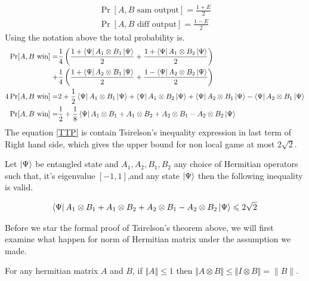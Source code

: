 \begin{align*}
\Pr[A,B \text{ sam output}]=\frac{1+E}{2}\\
\Pr[A,B \text{ diff output}]=\frac{1-E}{2}
\end{align*}
Using the notation above the total probability is.
\begin{align}\label{TTP}
\Pr[A,B \text{ win}]=&\frac{1}{4}\left(\frac{1+\bra{\Psi}A_1\otimes B_1\ket{\Psi}}{2}
+\frac{1+\bra{\Psi}A_1\otimes B_2\ket{\Psi}}{2}\right)\nonumber\\
+&\frac{1}{4}\left(\frac{1+\bra{\Psi}A_2\otimes B_1\ket{\Psi}}{2}+\frac{1-\bra{\Psi}A_2\otimes B_2\ket{\Psi}}{2}\right)\nonumber\\
4 \Pr[A,B \text{ win}]=& 2+\frac{1}{2}\bra{\Psi}A_1\otimes B_1\ket{\Psi}
+\bra{\Psi}A_1\otimes B_2\ket{\Psi}+\bra{\Psi}A_2\otimes B_1\ket{\Psi}-\bra{\Psi}A_2\otimes B_1\ket{\Psi}\nonumber\\
\Pr[A,B \text{ win}]=&\frac{1}{2}+\frac{1}{8}\bra{\Psi}A_1\otimes B_1+ A_1\otimes B_2+A_2\otimes B_1 -A_2\otimes B_2\ket{\Psi}
\end{align}
The  equation \ref{TTP} is contain  Tsirelson’s inequality expression in last term of Right hand side, which gives the upper bound for non local  game at most $2\sqrt{2}$.

\begin{theorem}


Let $\ket{\Psi}$ be entangled state and $A_1,A_2, B_1,B_2$ any choice of Hermitian operators such that, it's eigenvalue $\left[-1,1\right]$,and any state $\ket{\Psi}$ then the following  inequality is valid.

\begin{align}
\bra{\Psi}A_1\otimes B_1+ A_1\otimes B_2+A_2\otimes B_1 -A_2\otimes B_2\ket{\Psi}\leqslant 2\sqrt{2}\label{TE}
\end{align}

\end{theorem}


Before we star the formal proof of Tsirelson’s theorem above, we will first examine what happen for norm of Hermitian matrix under the assumption we made.

\begin{lemma}
\label{lem:tensor-norm}
For any hermitian matrix $A$ and $B$, if $\Vert A\Vert \leqslant 1$ then $\Vert A\otimes B \Vert \leqslant \Vert I\otimes B \Vert=\|B\|$.
\end{lemma}

